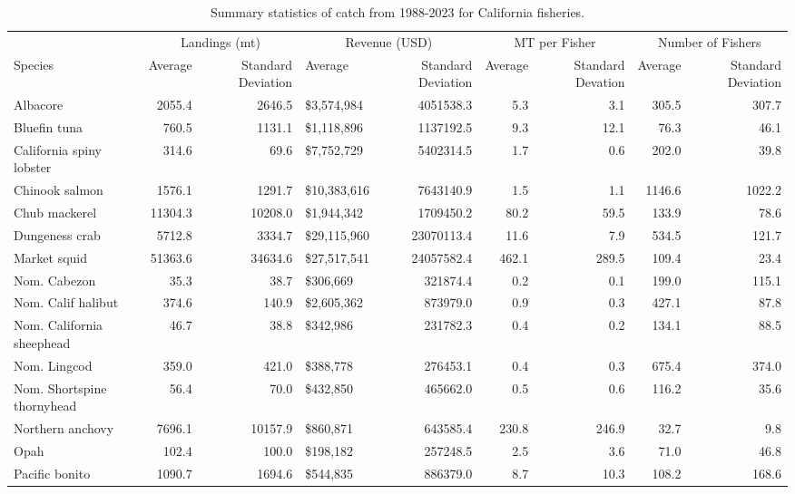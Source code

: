 \documentclass[
  letterpaper,
  DIV=11,
  numbers=noendperiod]{scrartcl}
\begin{document}
\hypertarget{tbl-fish-sum}{}
\begin{longtable}[t]{lrrlrrrrr}
\caption{\label{tbl-fish-sum}Summary statistics of catch from 1988-2023 for California fisheries. }\tabularnewline

\toprule
\multicolumn{1}{c}{ } & \multicolumn{2}{c}{Landings (mt)} & \multicolumn{2}{c}{Revenue (USD)} & \multicolumn{2}{c}{MT per Fisher} & \multicolumn{2}{c}{Number of Fishers} \\
\cmidrule(l{3pt}r{3pt}){2-3} \cmidrule(l{3pt}r{3pt}){4-5} \cmidrule(l{3pt}r{3pt}){6-7} \cmidrule(l{3pt}r{3pt}){8-9}
Species & Average & Standard
Deviation & Average & Standard
Deviation & Average & Standard
Devation & Average & Standard
Deviation\\
\midrule
Albacore & 2055.4 & 2646.5 & \$3,574,984 & 4051538.3 & 5.3 & 3.1 & 305.5 & 307.7\\
Bluefin tuna & 760.5 & 1131.1 & \$1,118,896 & 1137192.5 & 9.3 & 12.1 & 76.3 & 46.1\\
California spiny lobster & 314.6 & 69.6 & \$7,752,729 & 5402314.5 & 1.7 & 0.6 & 202.0 & 39.8\\
Chinook salmon & 1576.1 & 1291.7 & \$10,383,616 & 7643140.9 & 1.5 & 1.1 & 1146.6 & 1022.2\\
Chub mackerel & 11304.3 & 10208.0 & \$1,944,342 & 1709450.2 & 80.2 & 59.5 & 133.9 & 78.6\\
\addlinespace
Dungeness crab & 5712.8 & 3334.7 & \$29,115,960 & 23070113.4 & 11.6 & 7.9 & 534.5 & 121.7\\
Market squid & 51363.6 & 34634.6 & \$27,517,541 & 24057582.4 & 462.1 & 289.5 & 109.4 & 23.4\\
Nom. Cabezon & 35.3 & 38.7 & \$306,669 & 321874.4 & 0.2 & 0.1 & 199.0 & 115.1\\
Nom. Calif halibut & 374.6 & 140.9 & \$2,605,362 & 873979.0 & 0.9 & 0.3 & 427.1 & 87.8\\
Nom. California sheephead & 46.7 & 38.8 & \$342,986 & 231782.3 & 0.4 & 0.2 & 134.1 & 88.5\\
\addlinespace
Nom. Lingcod & 359.0 & 421.0 & \$388,778 & 276453.1 & 0.4 & 0.3 & 675.4 & 374.0\\
Nom. Shortspine thornyhead & 56.4 & 70.0 & \$432,850 & 465662.0 & 0.5 & 0.6 & 116.2 & 35.6\\
Northern anchovy & 7696.1 & 10157.9 & \$860,871 & 643585.4 & 230.8 & 246.9 & 32.7 & 9.8\\
Opah & 102.4 & 100.0 & \$198,182 & 257248.5 & 2.5 & 3.6 & 71.0 & 46.8\\
Pacific bonito & 1090.7 & 1694.6 & \$544,835 & 886379.0 & 8.7 & 10.3 & 108.2 & 168.6\\

\end{longtable}
\end{document}

